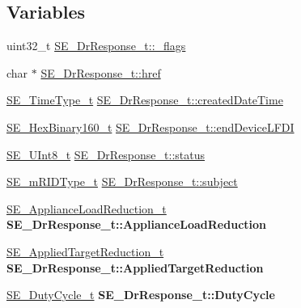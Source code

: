 \subsection*{Variables}
\begin{DoxyCompactItemize}
\item 
uint32\+\_\+t \hyperlink{group__DrResponse_ga3935b911a2459587ec94199037ab0e0b}{S\+E\+\_\+\+Dr\+Response\+\_\+t\+::\+\_\+flags}
\item 
char $\ast$ \hyperlink{group__DrResponse_gad93328683bc0ae7951dd64d6d9ef75d6}{S\+E\+\_\+\+Dr\+Response\+\_\+t\+::href}
\item 
\hyperlink{group__TimeType_ga6fba87a5b57829b4ff3f0e7638156682}{S\+E\+\_\+\+Time\+Type\+\_\+t} \hyperlink{group__DrResponse_gadaad04b0b35d8f1e04852a97853ff85a}{S\+E\+\_\+\+Dr\+Response\+\_\+t\+::created\+Date\+Time}
\item 
\hyperlink{group__HexBinary160_ga92b92aa55555bdb75f3a59060f2c1632}{S\+E\+\_\+\+Hex\+Binary160\+\_\+t} \hyperlink{group__DrResponse_ga71a72ff947c30daf23717299c9bec0b4}{S\+E\+\_\+\+Dr\+Response\+\_\+t\+::end\+Device\+L\+F\+DI}
\item 
\hyperlink{group__UInt8_gaf7c365a1acfe204e3a67c16ed44572f5}{S\+E\+\_\+\+U\+Int8\+\_\+t} \hyperlink{group__DrResponse_gacdaed09d4ca83cb5ca0c9a05403d075c}{S\+E\+\_\+\+Dr\+Response\+\_\+t\+::status}
\item 
\hyperlink{group__mRIDType_gac74622112f3a388a2851b2289963ba5e}{S\+E\+\_\+m\+R\+I\+D\+Type\+\_\+t} \hyperlink{group__DrResponse_gac4dc2f090a45b58f5379fc0566b52b3e}{S\+E\+\_\+\+Dr\+Response\+\_\+t\+::subject}
\item 
\mbox{\label{group__DrResponse_ga288d5879f14c98584c6bbc154e80f94a}} 
\hyperlink{structSE__ApplianceLoadReduction__t}{S\+E\+\_\+\+Appliance\+Load\+Reduction\+\_\+t} {\bfseries S\+E\+\_\+\+Dr\+Response\+\_\+t\+::\+Appliance\+Load\+Reduction}
\item 
\mbox{\label{group__DrResponse_ga96eb915241375b1451ae0f888593b129}} 
\hyperlink{structSE__AppliedTargetReduction__t}{S\+E\+\_\+\+Applied\+Target\+Reduction\+\_\+t} {\bfseries S\+E\+\_\+\+Dr\+Response\+\_\+t\+::\+Applied\+Target\+Reduction}
\item 
\mbox{\label{group__DrResponse_ga5bb778542d8b8bac3fc41112f6557dd1}} 
\hyperlink{structSE__DutyCycle__t}{S\+E\+\_\+\+Duty\+Cycle\+\_\+t} {\bfseries S\+E\+\_\+\+Dr\+Response\+\_\+t\+::\+Duty\+Cycle}

\end{DoxyCompactItemize}

